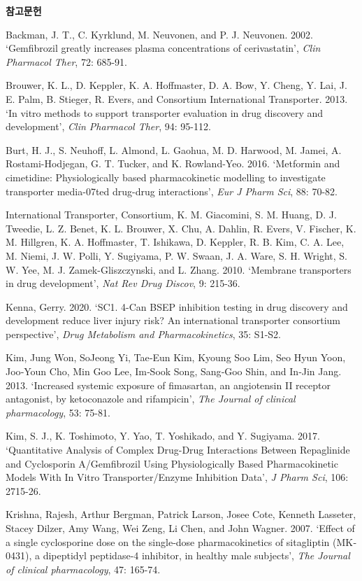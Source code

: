 \documentclass[
  11pt,
  krantz2, a4paper, twoside]{krantz}
\begin{document}
\textbf{참고문헌}

Backman, J. T., C. Kyrklund, M. Neuvonen, and P. J. Neuvonen. 2002.
`Gemfibrozil greatly increases plasma concentrations of cerivastatin',
\emph{Clin Pharmacol Ther}, 72: 685-91.

Brouwer, K. L., D. Keppler, K. A. Hoffmaster, D. A. Bow, Y. Cheng, Y.
Lai, J. E. Palm, B. Stieger, R. Evers, and Consortium International
Transporter. 2013. `In vitro methods to support transporter evaluation
in drug discovery and development', \emph{Clin Pharmacol Ther}, 94: 95-112.

Burt, H. J., S. Neuhoff, L. Almond, L. Gaohua, M. D. Harwood, M. Jamei,
A. Rostami-Hodjegan, G. T. Tucker, and K. Rowland-Yeo. 2016. `Metformin
and cimetidine: Physiologically based pharmacokinetic modelling to
investigate transporter media-07ted drug-drug interactions', \emph{Eur J
Pharm Sci}, 88: 70-82.

International Transporter, Consortium, K. M. Giacomini, S. M. Huang, D.
J. Tweedie, L. Z. Benet, K. L. Brouwer, X. Chu, A. Dahlin, R. Evers, V.
Fischer, K. M. Hillgren, K. A. Hoffmaster, T. Ishikawa, D. Keppler, R.
B. Kim, C. A. Lee, M. Niemi, J. W. Polli, Y. Sugiyama, P. W. Swaan, J.
A. Ware, S. H. Wright, S. W. Yee, M. J. Zamek-Gliszczynski, and L.
Zhang. 2010. `Membrane transporters in drug development', \emph{Nat Rev Drug
Discov}, 9: 215-36.

Kenna, Gerry. 2020. `SC1. 4-Can BSEP inhibition testing in drug
discovery and development reduce liver injury risk? An international
transporter consortium perspective', \emph{Drug Metabolism and
Pharmacokinetics}, 35: S1-S2.

Kim, Jung Won, SoJeong Yi, Tae‐Eun Kim, Kyoung Soo Lim, Seo Hyun Yoon,
Joo‐Youn Cho, Min Goo Lee, Im‐Sook Song, Sang‐Goo Shin, and In‐Jin Jang.
2013. `Increased systemic exposure of fimasartan, an angiotensin II
receptor antagonist, by ketoconazole and rifampicin', \emph{The Journal of
clinical pharmacology}, 53: 75-81.

Kim, S. J., K. Toshimoto, Y. Yao, T. Yoshikado, and Y. Sugiyama. 2017.
`Quantitative Analysis of Complex Drug-Drug Interactions Between
Repaglinide and Cyclosporin A/Gemfibrozil Using Physiologically Based
Pharmacokinetic Models With In Vitro Transporter/Enzyme Inhibition
Data', \emph{J Pharm Sci}, 106: 2715-26.

Krishna, Rajesh, Arthur Bergman, Patrick Larson, Josee Cote, Kenneth
Lasseter, Stacey Dilzer, Amy Wang, Wei Zeng, Li Chen, and John Wagner.
2007. `Effect of a single cyclosporine dose on the single‐dose
pharmacokinetics of sitagliptin (MK‐0431), a dipeptidyl peptidase‐4
inhibitor, in healthy male subjects', \emph{The Journal of clinical
pharmacology}, 47: 165-74.
\end{document}

